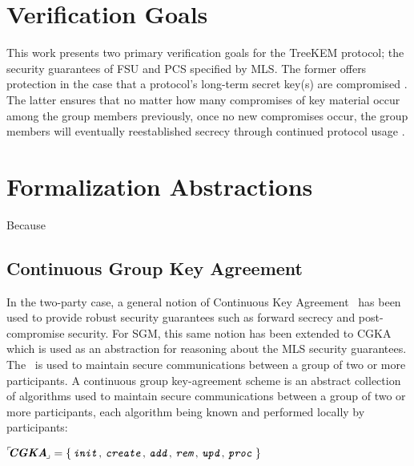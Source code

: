 \documentclass[runningheads]{llncs}
\newcommand{\Abrev}[1]{\gls{#1}}
\begin{document}
{%
\section{Verification Goals}\label{sec:forward-secrecy-with-updates}}

This work presents two primary verification goals for the TreeKEM protocol; the security guarantees of \Abrev{FSU} and  \Abrev{PCS} specified by \Abrev{MLS}.
The former offers protection in the case that a protocol's long-term secret key(s) are compromised \cite{boyd2021modern}.
The latter ensures that no matter how many compromises of key material occur among the group members previously, once no new compromises occur, the group members will eventually reestablished secrecy through continued protocol usage \cite{alwen2020security}.\\[-1mm]



\section{Formalization Abstractions\label{sec:Formal-Abstractions}}

Because 

\subsection{Continuous Group Key Agreement}

In the two-party case, a general notion of Continuous Key Agreement~\cite{alwen2019double} has been used to provide robust security guarantees such as forward secrecy and post-compromise security.
For \Abrev{SGM}, this same notion has been extended to \Abrev{CGKA}~\cite{alwen2020security} which is used as an abstraction for reasoning about the \Abrev{MLS} security guarantees.
The  \CGKAdef\ is used to maintain secure communications between a group of two or more participants.
A continuous group key-agreement scheme is an abstract collection of algorithms used to maintain secure communications between a group of two or more participants, each algorithm being known and performed locally by participants:\\[2mm]
\centerline{${}^{\ulcorner}\!\!\textbf{\textit{CGKA}}_{\!\lrcorner} = \left\{\,\texttt{\textit{init}},\, \texttt{\textit{create}},\, \texttt{\textit{add}},\, \texttt{\textit{rem}},\, \texttt{\textit{upd}},\, \texttt{\textit{proc}}\,\right\}$}\\[-3mm]
\end{document}
